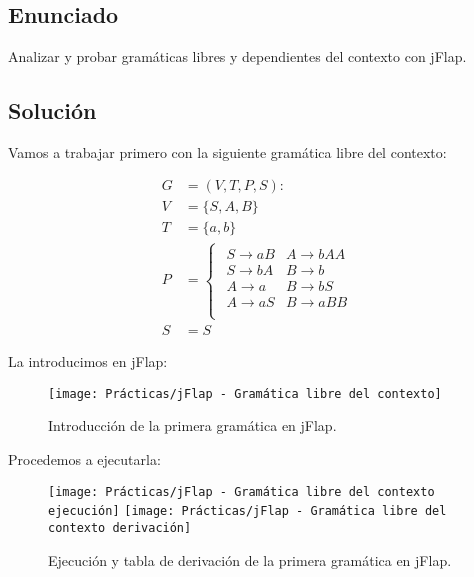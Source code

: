 \chapter{}

\section{Enunciado}

Analizar y probar gramáticas libres y dependientes del contexto con jFlap.

\section{Solución}

Vamos a trabajar primero con la siguiente gramática libre del contexto:

\begin{align*}
	G &= (V, T, P, S) : \\
	V &= \{S, A, B\} \\
	T &= \{a, b\} \\
	P &=
		\begin{cases}
		\begin{array}{ll}
			S \rightarrow aB & A \rightarrow bAA \\
			S \rightarrow bA & B \rightarrow b   \\
			A \rightarrow a  & B \rightarrow bS  \\
			A \rightarrow aS & B \rightarrow aBB \\
		\end{array}
 		\end{cases} \\
	S &= S
\end{align*}

La introducimos en jFlap:

\begin{figure}[h!]
\begin{center}
	\texttt{[image: Prácticas/jFlap - Gramática libre del contexto]}
\end{center}
\caption{Introducción de la primera gramática en jFlap.}
\end{figure}

\pagebreak

Procedemos a ejecutarla:

\begin{figure}[h!]
\begin{center}
	\texttt{[image: Prácticas/jFlap - Gramática libre del contexto ejecución]}
	\texttt{[image: Prácticas/jFlap - Gramática libre del contexto derivación]}
\end{center}
\caption{Ejecución y tabla de derivación de la primera gramática en jFlap.}
\end{figure}

